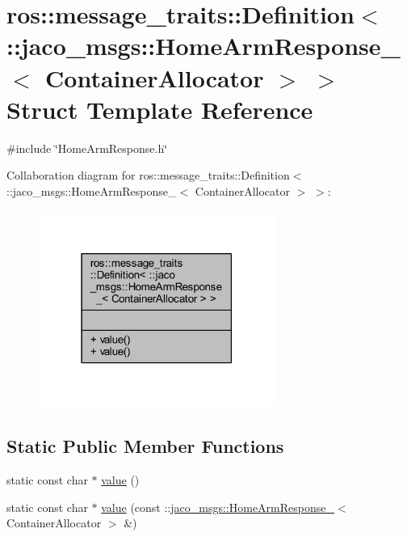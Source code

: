 \hypertarget{structros_1_1message__traits_1_1Definition_3_01_1_1jaco__msgs_1_1HomeArmResponse___3_01ContainerAllocator_01_4_01_4}{}\section{ros\+:\+:message\+\_\+traits\+:\+:Definition$<$ \+:\+:jaco\+\_\+msgs\+:\+:Home\+Arm\+Response\+\_\+$<$ Container\+Allocator $>$ $>$ Struct Template Reference}
\label{structros_1_1message__traits_1_1Definition_3_01_1_1jaco__msgs_1_1HomeArmResponse___3_01ContainerAllocator_01_4_01_4}


{\ttfamily \#include \char`\"{}Home\+Arm\+Response.\+h\char`\"{}}



Collaboration diagram for ros\+:\+:message\+\_\+traits\+:\+:Definition$<$ \+:\+:jaco\+\_\+msgs\+:\+:Home\+Arm\+Response\+\_\+$<$ Container\+Allocator $>$ $>$\+:
\nopagebreak
\begin{figure}[H]
\begin{center}
\leavevmode
\includegraphics[width=219pt]{dc/d4c/structros_1_1message__traits_1_1Definition_3_01_1_1jaco__msgs_1_1HomeArmResponse___3_01Container8bbcdeacab4d582f05ec081d664f114c}
\end{center}
\end{figure}
\subsection*{Static Public Member Functions}
\begin{DoxyCompactItemize}
\item 
static const char $\ast$ \hyperlink{structros_1_1message__traits_1_1Definition_3_01_1_1jaco__msgs_1_1HomeArmResponse___3_01ContainerAllocator_01_4_01_4_a5570d43bd199df4ec5e2be2a2ad53fc6}{value} ()
\item 
static const char $\ast$ \hyperlink{structros_1_1message__traits_1_1Definition_3_01_1_1jaco__msgs_1_1HomeArmResponse___3_01ContainerAllocator_01_4_01_4_a23fa332fb1f43fd3a09c5fd70fad8d39}{value} (const \+::\hyperlink{structjaco__msgs_1_1HomeArmResponse__}{jaco\+\_\+msgs\+::\+Home\+Arm\+Response\+\_\+}$<$ Container\+Allocator $>$ \&)
\end{DoxyCompactItemize}


